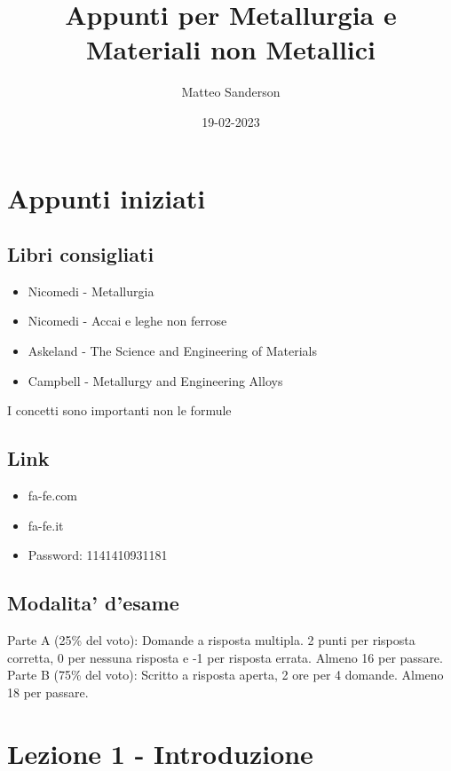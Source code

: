 \documentclass{article}
\title{Appunti per Metallurgia e Materiali non Metallici}
\date{19-02-2023}
\author{Matteo Sanderson}
\begin{document}
    \maketitle
    \newpage
    \newpage
    \tableofcontents
    \setcounter{tocdepth}{5}
    \newpage
    \section{Appunti iniziati}
        \subsection{Libri consigliati}
            \begin{itemize}
                \item Nicomedi - Metallurgia
                \item Nicomedi - Accai e leghe non ferrose
                \item Askeland - The Science and Engineering of Materials
                \item Campbell - Metallurgy and Engineering Alloys
            \end{itemize}
        I concetti sono importanti non le formule
        \subsection{Link}
            \begin{itemize}
                \item fa-fe.com
                \item fa-fe.it
                \item Password: 1141410931181
            \end{itemize}
        \subsection{Modalita' d'esame}
            Parte A (25\% del voto): Domande a risposta multipla. 2 punti per risposta corretta, 0 per nessuna risposta e -1 per risposta errata. Almeno 16 per passare.
            \newline Parte B (75\% del voto): Scritto a risposta aperta, 2 ore per 4 domande. Almeno 18 per passare.         
    \section{Lezione 1 - Introduzione}
\end{document}
